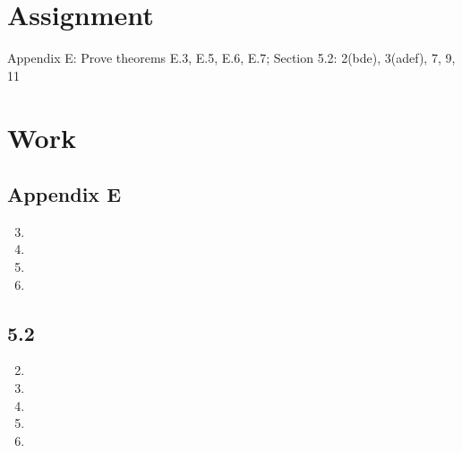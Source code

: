 \documentclass[letterpaper,12pt]{article}
\begin{document}
\section*{Assignment}
Appendix E: Prove theorems E.3, E.5, E.6, E.7; Section 5.2: 2(bde), 3(adef), 7, 9, 11
\section*{Work}
\subsection*{Appendix E}
\begin{enumerate}
\setcounter{enumi}{2}
\item

\setcounter{enumi}{4}
\item

\newpage{}
\item

\item

\end{enumerate}
\newpage{}
\subsection*{5.2}
\begin{enumerate}
\setcounter{enumi}{1}
\item

\newpage{}
\item

\setcounter{enumi}{6}
\item

\setcounter{enumi}{8}
\item

\setcounter{enumi}{10}
\item

\end{enumerate}
\end{document}

